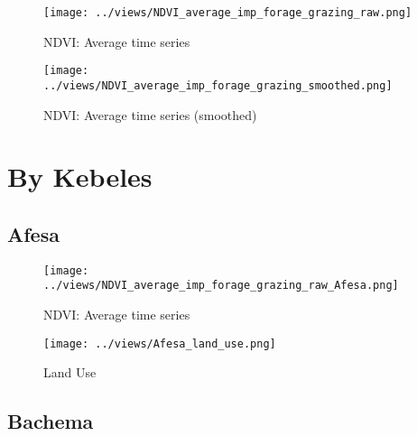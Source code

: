 \documentclass[10pt,a4paper,onecolumn]{article}
\begin{document}
\begin{figure}[H] \centering
  \captionsetup{justification=centering}
\caption{NDVI: Average time series} 
\centering


\texttt{[image: ../views/NDVI\_average\_imp\_forage\_grazing\_raw.png]}

\end{figure}



\begin{figure}[H] \centering
  \captionsetup{justification=centering}
\caption{NDVI: Average time series (smoothed)} 
\centering


\texttt{[image: ../views/NDVI\_average\_imp\_forage\_grazing\_smoothed.png]}

\end{figure}



\pagebreak

\section{By Kebeles}

\subsection{Afesa}
\begin{figure}[H] \centering
  \captionsetup{justification=centering}
\caption{NDVI: Average time series } 
\centering


\texttt{[image: ../views/NDVI\_average\_imp\_forage\_grazing\_raw\_Afesa.png]}

\end{figure}

\begin{figure}[H] \centering
  \captionsetup{justification=centering}
\caption{Land Use} 
\centering


\texttt{[image: ../views/Afesa\_land\_use.png]}

\end{figure}





\pagebreak


\subsection{Bachema}
\end{document}
